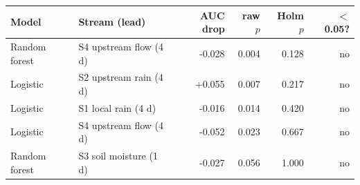 \begin{tabular}{@{}llrrrr@{}}
\toprule
Model & Stream (lead) & AUC drop & raw $p$ & Holm $p$ & $<$0.05? \\
\midrule
Random forest & S4 upstream flow (4 d) & -0.028 & 0.004 & 0.128 & no \\
Logistic & S2 upstream rain (4 d) & +0.055 & 0.007 & 0.217 & no \\
Logistic & S1 local rain (4 d) & -0.016 & 0.014 & 0.420 & no \\
Logistic & S4 upstream flow (4 d) & -0.052 & 0.023 & 0.667 & no \\
Random forest & S3 soil moisture (1 d) & -0.027 & 0.056 & 1.000 & no \\
\bottomrule
\end{tabular}
